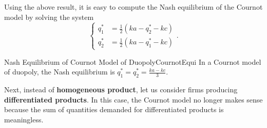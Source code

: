 \documentclass[math]{amznotes}
\theoremstyle{remark}
\begin{document}
Using the above result, it is easy to compute the Nash equilibrium of the Cournot model by solving the system 
\begin{equation*}
    \begin{cases}
        q_1^* & = \frac{1}{2}\left(ka - q_2^* - kc\right) \\
        q_2^* & = \frac{1}{2}\left(ka - q_1^* - kc\right)
    \end{cases}.
\end{equation*}
\begin{corbox}{Nash Equilibrium of Cournot Model of Duopoly}{CournotEqui}
    In a Cournot model of duopoly, the Nash equilibrium is $q_1^* = q_2^* = \frac{ka - kc}{3}$.
\end{corbox}
Next, instead of \textbf{homogeneous product}, let us consider firms producing \textbf{differentiated products}. In this case, the Cournot model no longer makes sense because the sum of quantities demanded for differentiated products is meaningless.
\end{document}
